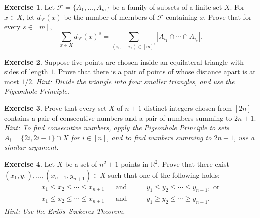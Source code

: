 \documentclass[11pt, letter]{amsart}
\theoremstyle{definition}
\newtheorem{exercise}{Exercise}[]
\newcommand\cF{{\mathcal F}}
\begin{document}
\begin{exercise}
  Let $\cF = \{A_1, \dots, A_m\}$ be a family of subsets of a finite set $X$.  For $x \in X$, let $d_\cF(x)$ be the number of members of $\cF$ containing $x$.  Prove that for every $s \in [m]$,
  \begin{equation*}
    \sum_{x \in X}d_\cF(x)^s = \sum_{(i_1, \dots, i_s)\in [m]^s}\left| A_{i_1} \cap \cdots \cap A_{i_s}\right|.
  \end{equation*}
\end{exercise}
\begin{exercise}
  Suppose five points are chosen inside an equilateral triangle with sides of length $1$.  Prove that there is a pair of points of whose distance apart is at most $1/2$.  \textit{Hint: Divide the triangle into four smaller triangles, and use the Pigeonhole Principle.}
\end{exercise}
\begin{exercise}
  Prove that every set $X$ of $n + 1$ distinct integers chosen from $[2n]$ contains a pair of consecutive numbers and a pair of numbers summing to $2n + 1$.  \textit{Hint: To find consecutive numbers, apply the Pigeonhole Principle to sets $A_i = \{2i, 2i - 1\} \cap X$ for $i \in [n]$, and to find numbers summing to $2n + 1$, use a similar argument.}  
\end{exercise}
\begin{exercise}
  Let $X$ be a set of $n^2 + 1$ points in $\mathbb R^2$.  Prove that there exist $(x_1, y_1), \dots, (x_{n+1}, y_{n+1}) \in X$ such that one of the following holds:
  \begin{align*}
    && x_1 \leq x_2 \leq \cdots \leq x_{n+1} && \text{and } && &y_1 \leq y_2 \leq \cdots \leq y_{n+1}, \text{ or}&&\\
    && x_1 \leq x_2 \leq \cdots \leq x_{n+1} && \text{and } && &y_1 \geq y_2 \leq \cdots \geq y_{n+1}.&&
  \end{align*}
  \textit{Hint: Use the Erd\H{o}s--Szekerez Theorem.}
\end{exercise}
\clearpage
\end{document}
